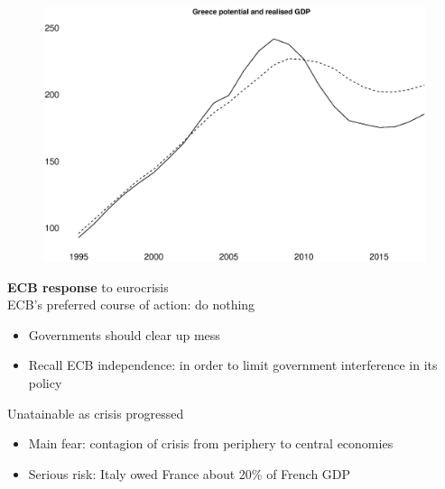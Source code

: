 \documentclass{beamer}
\begin{document}
\begin{frame}
  \begin{figure}
    \includegraphics[scale=.3]{greece5.eps}
  \end{figure}
\end{frame}


\begin{frame}
  \textbf{ECB response} to eurocrisis\\
   ECB's preferred course of action: do nothing
   \begin{itemize}
      \item Governments should clear up mess
      \item Recall ECB independence: in order to limit government interference in its policy
    \end{itemize} 
    \medskip
    Unatainable as crisis progressed    
    \begin{itemize}
      \item Main fear: contagion of crisis from periphery to central economies
      \item Serious risk: Italy owed France about 20\% of French GDP
    \end{itemize}
\end{frame}
\end{document}
